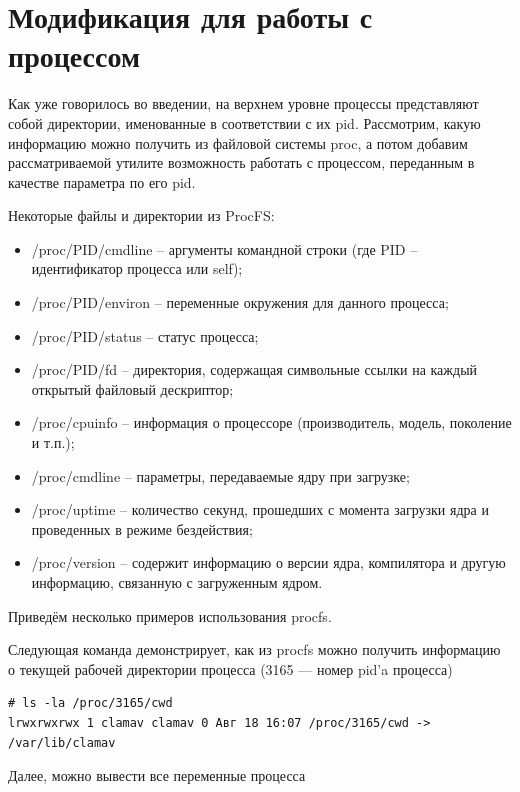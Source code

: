 \documentclass[a4paper, 12pt]{article}		%
\begin{document}
\newpage%
\section{Модификация для работы с процессом}

Как уже говорилось во введении, на верхнем уровне процессы представляют собой директории, именованные в соответствии с их pid. Рассмотрим, какую информацию можно получить из файловой системы proc, а потом добавим рассматриваемой утилите возможность работать с процессом, переданным в качестве параметра по его pid.

Некоторые файлы и директории из ProcFS\cite{HowTo}:
\begin{itemize}
\item /proc/PID/cmdline – аргументы командной строки (где PID – идентификатор процесса или self);
\item /proc/PID/environ – переменные окружения для данного процесса;
\item /proc/PID/status – статус процесса;
\item /proc/PID/fd – директория, содержащая символьные ссылки на каждый открытый файловый дескриптор;
\item /proc/cpuinfo – информация о процессоре (производитель, модель, поколение и т.п.);
\item /proc/cmdline – параметры, передаваемые ядру при загрузке;
\item /proc/uptime – количество секунд, прошедших с момента загрузки ядра и проведенных в режиме бездействия;
\item /proc/version – содержит информацию о версии ядра, компилятора и другую информацию, связанную с загруженным ядром.
\end{itemize}

Приведём несколько примеров использования procfs.

Следующая команда демонстрирует, как из procfs можно получить информацию о текущей рабочей директории процесса (3165 — номер pid’a процесса)

\begin{verbatim}
# ls -la /proc/3165/cwd
lrwxrwxrwx 1 clamav clamav 0 Авг 18 16:07 /proc/3165/cwd -> /var/lib/clamav
\end{verbatim}

Далее, можно вывести все переменные процесса
\end{document}
